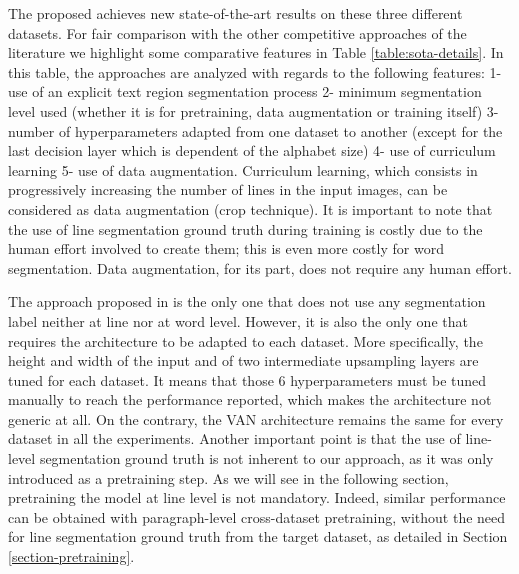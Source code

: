 The proposed \modelname{} achieves new state-of-the-art results on these three different datasets. 
For fair comparison with the other competitive approaches of the literature we highlight some comparative features in Table \ref{table:sota-details}. In this table, the approaches are analyzed with regards to the following features: 1- use of an explicit text region segmentation process 2- minimum segmentation level used (whether it is for pretraining, data augmentation or training itself) 3- number of hyperparameters adapted from one dataset to another (except for the last decision layer which is dependent of the alphabet size) 4- use of curriculum learning 5- use of data augmentation. 
Curriculum learning, which consists in progressively increasing the number of lines in the input images, can be considered as data augmentation (crop technique). It is important to note that the use of line segmentation ground truth during training is costly due to the human effort involved to create them; this is even more costly for word segmentation. Data augmentation, for its part, does not require any human effort. 

The approach proposed in \cite{Yousef2020} is the only one that does not use any segmentation label neither at line nor at word level. However, it is also the only one that requires the architecture to be adapted to each dataset. More specifically, the height and width of the input and of two intermediate upsampling layers are tuned for each dataset. It means that those 6 hyperparameters must be tuned manually to reach the performance reported, which makes the architecture not generic at all. On the contrary, the VAN architecture remains the same for every dataset in all the experiments. Another important point is that the use of line-level segmentation ground truth is not inherent to our approach, as it was only introduced as a pretraining step. As we will see in the following section, pretraining the model at line level is not mandatory. Indeed, similar performance can be obtained with paragraph-level cross-dataset pretraining, without the need for line segmentation ground truth from the target dataset, as detailed in Section \ref{section-pretraining}.


